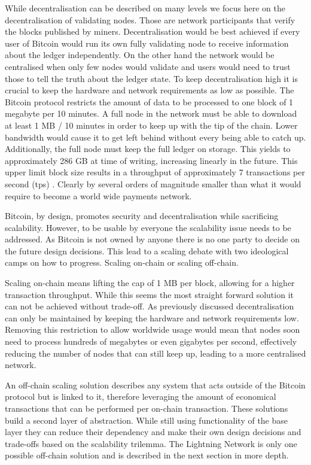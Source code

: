 \documentclass[final]{fhnwreport}       %
\begin{document}
While decentralisation can be described on many levels we focus here on the decentralisation of validating nodes. Those are network participants that verify the blocks published by miners. Decentralisation would be best achieved if  every user of Bitcoin would run its own fully validating node to receive information about the ledger independently. On the other hand the network would be centralised when only few nodes would validate and users would need to trust those to tell the truth about the ledger state. To keep decentralisation high it is crucial to keep the hardware and network requirements as low as possible. The Bitcoin protocol restricts the amount of data to be processed to one block of 1 megabyte per 10 minutes. A full node in the network must be able to download at least 1 MB / 10 minutes in order to keep up with the tip of the chain. Lower bandwidth would cause it to get left behind without every being able to catch up. Additionally, the full node must keep the full ledger on storage. This yields to approximately 286 GB \cite{noauthor_blocks-size_nodate} at time of writing, increasing linearly in the future. This upper limit block size results in a throughput of approximately 7 transactions per second (tps) \cite{noauthor_scalability_nodate}. Clearly by several orders of magnitude smaller than what it would require to become a world wide payments network. 

Bitcoin, by design, promotes security and decentralisation while sacrificing scalability. However, to be usable by everyone the scalability issue needs to be addressed. As Bitcoin is not owned by anyone there is no one party to decide on the future design decisions. This lead to a scaling debate with two ideological camps on how to progress. Scaling on-chain or scaling off-chain.

Scaling on-chain means lifting the cap of 1 MB per block, allowing for a higher transaction throughput. While this seems the most straight forward solution it can not be achieved without trade-off. As previously discussed decentralisation can only be maintained by keeping the hardware and network requirements low. Removing this restriction to allow worldwide usage would mean that nodes soon need to process hundreds of megabytes or even gigabytes per second, effectively reducing the number of nodes that can still keep up, leading to a more centralised network. 

An off-chain scaling solution describes any system that acts outside of the Bitcoin protocol but is linked to it, therefore leveraging the amount of economical transactions that can be performed per on-chain transaction. These solutions build a second layer of abstraction. While still using functionality of the base layer they can reduce their dependency and make their own design decisions and trade-offs based on the scalability trilemma. The Lightning Network is only one possible off-chain solution and is described in the next section in more depth. 
\end{document}
